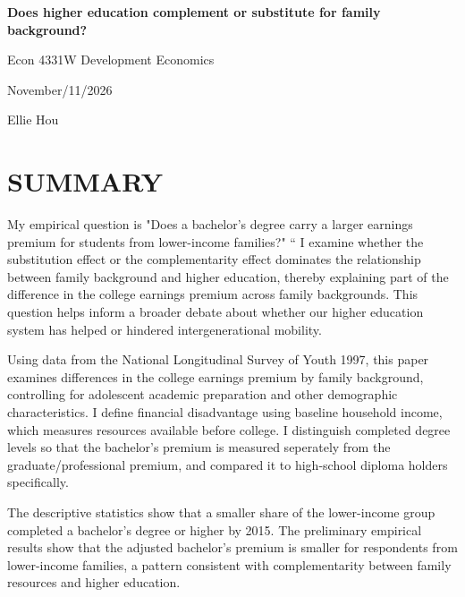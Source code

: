 \documentclass[12pt,letterpaper]{article}
\begin{document}
\hypersetup{pageanchor=false}
\begin{titlepage}
    \centering
    \singlespacing
    \vspace*{1.5in}

    {\bfseries Does higher education complement or substitute for family background?\par}
    \vspace{\baselineskip}
    Econ 4331W Development Economics\par
    November/11/2026\par
    Ellie Hou\par

    \vfill
\end{titlepage}
\hypersetup{pageanchor=true}

\singlespacing
\raggedright

\section*{SUMMARY}
My empirical question is "Does a bachelor's degree carry a larger earnings premium for students 
from lower-income families?" “ I examine whether the substitution effect or the complementarity 
effect dominates the relationship between family background and higher education, thereby explaining
part of the difference in the college earnings premium across family backgrounds. 
This question helps inform a broader debate about whether our higher education system 
has helped or hindered intergenerational mobility. \newline

Using data from the National Longitudinal Survey of Youth 1997, this paper examines differences
in the college earnings premium by family background, controlling for adolescent academic
preparation and other demographic characteristics. I define financial disadvantage using 
baseline household income, which measures resources available before college. 
I distinguish completed degree levels so that the bachelor's premium is measured seperately 
from the graduate/professional premium, and compared it to high-school diploma holders specifically.\newline

The descriptive statistics show that a smaller share of the lower-income group completed
a bachelor's degree or higher by 2015. The preliminary empirical results show that the 
adjusted bachelor's premium is smaller for respondents from lower-income families, a pattern 
consistent with complementarity between family resources and higher education.\newline
\end{document}
